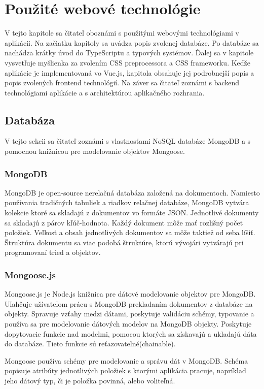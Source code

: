 \chapter{Použité webové technológie}
\label{kapitola3}
V tejto kapitole sa čitateľ oboznámi s použitými webovými technológiami v aplikácii. Na začiatku kapitoly sa uvádza popis zvolenej databáze. Po databáze sa nachádza krátky úvod do TypeScriptu a typových systémov. Ďalej sa v kapitole vysvetľuje myšlienka za zvolením CSS preprocessora a CSS frameworku. Keďže aplikácie je implementovaná vo Vue.js, kapitola obsahuje jej podrobnejší popis a popis zvolených frontend technológií. Na záver sa čitateľ zoznámi s backend technológiami aplikácie a s architektúrou aplikačného rozhrania.

\section{Databáza}
V tejto sekcii sa čitateľ zoznámi s vlastnosťami NoSQL databáze MongoDB a s pomocnou knižnicou pre modelovanie objektov Mongoose. 

\subsection{MongoDB}
\label{mongodb}
MongoDB\cite{mongodb} je open-source nerelačná databáza založená na dokumentoch. Namiesto používania tradičných tabuliek a riadkov relačnej databáze, MongoDB vytvára kolekcie ktoré sa skladajú z dokumentov vo formáte JSON. Jednotlivé dokumenty sa skladajú z párov kľúč-hodnota. Každý dokument môže mať rozlišný počet položiek. Veľkosť a obsah jednotlivých dokumentov sa môže taktiež od seba líšiť. Štruktúra dokumentu sa viac podobá štruktúre, ktorú vývojári vytvárajú pri programovaní tried a objektov. 

\subsection{Mongoose.js}
\label{mongoose}
Mongoose.js\cite{mongoose} je Node.js knižnica pre dátové modelovanie objektov pre MongoDB. Uľahčuje užívateľom prácu s MongoDB prekladaním dokumentov z databáze na objekty. Spravuje vzťahy medzi dátami, poskytuje validáciu schémy, typovanie a používa sa pre modelovanie dátových modelov na MongoDB objekty. Poskytuje dopytovacie funkcie nad modelmi, pomocou ktorých sa získavajú a ukladajú dáta do databáze. Tieto funkcie sú reťazovatelné(chainable). 

Mongoose používa schémy pre modelovanie a správu dát v MongoDB. Schéma popisuje atribúty jednotlivých položiek s ktorými aplikácia pracuje, napríklad jeho dátový typ, či je položka povinná, alebo voliteľná. 

